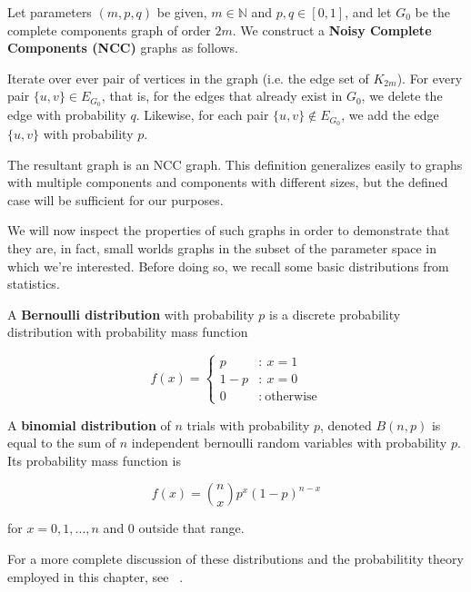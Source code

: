 \begin{definition}
  \label{def:ncc}
  Let parameters $(m,p,q)$ be given, $m \in \mathbb{N}$ and $p,q \in [0,1]$, and let $G_0$ be the
  complete components graph of order $2m$. We construct a \textbf{Noisy Complete Components (NCC)}
  graphs as follows.

  Iterate over ever pair of vertices in the graph (i.e. the edge set of
  $K_{2m}$). For every pair $\{u,v\} \in E_{G_0}$, that is, for the edges that
  already exist in $G_0$, we delete the edge with probability $q$. Likewise, for
  each pair $\{u,v\} \notin E_{G_0}$, we add the edge $\{u,v\}$ with probability
  $p$.

  The resultant graph is an NCC graph. This definition generalizes easily to graphs with multiple
  components and components with different sizes, but the defined case will be sufficient for our
  purposes.
\end{definition}

We will now inspect the properties of such graphs in order to demonstrate that they are, in fact,
small worlds graphs in the subset of the parameter space in which we're interested. Before doing so,
we recall some basic distributions from statistics.

\begin{definition}
  A \textbf{Bernoulli distribution} with probability $p$ is a discrete probability distribution
  with probability mass function

  \[
    f(x) =
      \begin{cases}
        p &:~ x = 1 \\
        1-p &:~ x = 0 \\
        0 &:~ \text{otherwise}
      \end{cases}
    \]

  A \textbf{binomial distribution} of $n$ trials with probability $p$, denoted $B(n,p)$ is equal to
  the sum of $n$ independent bernoulli random variables with probability $p$. Its probability mass
  function is

  \[
    f(x) = {n \choose x} p^x(1-p)^{n-x}
  \]

  for $x = 0,1,...,n$ and $0$ outside that range.

  For a more complete discussion of these distributions and the probabilitity theory employed in
  this chapter, see ~\cite{CaseBerg:01}.
\end{definition}


